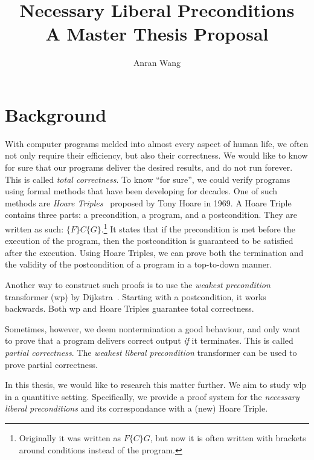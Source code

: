 \documentclass[adraft,hidelinks]{eptcs}
\begin{document}
\def\titlerunning{Proposal}
\def\authorrunning{Anran Wang}
\title{\Large Necessary Liberal Preconditions \\\normalsize A Master Thesis Proposal}
\author{Anran Wang}
\maketitle


%
\section{Background}\label{sec:intro}

With computer programs melded into almost every aspect of human life, we often not only require their efficiency, but also their correctness. 
We would like to know for sure that our programs deliver the desired results, and do not run forever. 
This is called \textit{total correctness}. 
To know ``for sure'', we could verify programs using formal methods that have been developing for decades. 
One of such methods are \textit{Hoare Triples}~\cite{Hoare1969} proposed by Tony Hoare in 1969. 
A Hoare Triple contains three parts: a precondition, a program, and a postcondition. 
They are written as such: $\{F\}C\{G\}$.\footnote{Originally it was written as $F \{C\} G$, but now it is often written with brackets around conditions instead of the program.} 
It states that if the precondition is met before the execution of the program, then the postcondition is guaranteed to be satisfied after the execution. 
Using Hoare Triples, we can prove both the termination and the validity of the postcondition of a program in a top-to-down manner. 

Another way to construct such proofs is to use the \textit{weakest precondition} transformer (wp) by Dijkstra~\cite{Dijkstra1975}. 
Starting with a postcondition, it works backwards. 
Both wp and Hoare Triples guarantee total correctness. 

Sometimes, however, we deem nontermination a good behaviour, and only want to prove that a program delivers correct output \textit{if} it terminates.
This is called \textit{partial correctness}. 
The \textit{weakest liberal precondition} transformer \cite{Dijkstra1990} can be used to prove partial correctness. 

In this thesis, we would like to research this matter further. 
We aim to study wlp in a quantitive setting. 
Specifically, we provide a proof system for the \textit{necessary liberal preconditions} and its correspondance with a (new) Hoare Triple.
\end{document}
